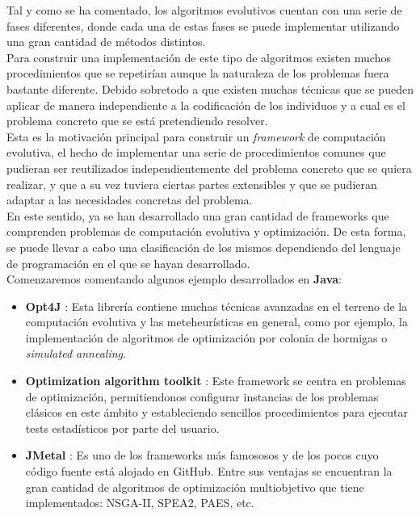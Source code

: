 

Tal y como se ha comentado, los algoritmos evolutivos cuentan con una serie de fases diferentes, donde cada una de estas fases se puede implementar utilizando una gran cantidad de métodos distintos.\\

Para construir una implementación de este tipo de algoritmos existen muchos procedimientos que se repetirían aunque la naturaleza de los problemas fuera bastante diferente. Debido sobretodo a que existen muchas técnicas que se pueden aplicar de manera independiente a la codificación de los individuos y a cual es el problema concreto que se está pretendiendo resolver. \\

Esta es la motivación principal para construir un \textit{framework} de computación evolutiva, el hecho de implementar una serie de procedimientos comunes que pudieran ser reutilizados independientemente del problema concreto que se quiera realizar, y que a su vez tuviera ciertas partes extensibles y que se pudieran adaptar a las necesidades concretas del problema. \\

En este sentido, ya se han desarrollado una gran cantidad de frameworks que comprenden problemas de computación evolutiva y optimización. De esta forma, se puede llevar a cabo una clasificación de los mismos dependiendo del lenguaje de programación en el que se hayan desarrollado. \\

Comenzaremos comentando algunos ejemplo desarrollados en \textbf{Java}:

\begin{itemize}
    \item \textbf{Opt4J} \cite{lukasiewycz2009opt4j}: Esta librería contiene muchas técnicas avanzadas en el terreno de la computación evolutiva y las meteheurísticas en general, como por ejemplo, la implementación de algoritmos de optimización por colonia de hormigas o \textit{simulated annealing}.
    \item \textbf{Optimization algorithm toolkit} \cite{brownlee2007oat}: Este framework se centra en problemas de optimización, permitiendonos configurar instancias de los problemas clásicos en este ámbito y estableciendo sencillos procedimientos para ejecutar tests estadísticos por parte del usuario.
    \item \textbf{JMetal} \cite{durillo2011jmetal}: Es uno de los frameworks más famososos y de los pocos cuyo código fuente está alojado en GitHub. Entre sus ventajas se encuentran la gran cantidad de algoritmos de optimización multiobjetivo que tiene implementados:  NSGA-II, SPEA2, PAES, etc.
\end{itemize}

